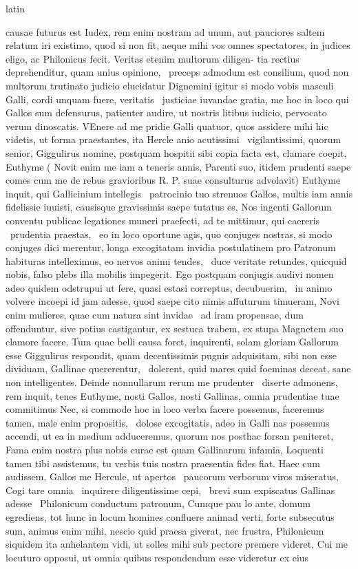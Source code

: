 \documentclass[12pt]{book}
\renewenvironment{latin}
    	{\begin{hyphenrules}{latin}}
    	{\end{hyphenrules}}
\begin{document}
\begin{pages}
\begin{latin}
\begin{Leftside}
causae futurus est Iudex, rem enim nostram ad unum, aut pauciores saltem relatum iri existimo, quod si non fit, aeque mihi vos omnes spectatores, in judices eligo, ac Philonicus fecit. Veritas etenim multorum diligen-   tia rectius deprehenditur, quam unius opinione, ﻿\ampersand\ preceps admodum est consilium, quod non multorum trutinato judicio elucidatur Dignemini igitur si modo vobis masculi Galli, cordi unquam fuere, veritatis ﻿\ampersand\ justiciae iuvandae gratia, me hoc in loco qui Gallos sum defensurus, patienter audire, ut nostris litibus iudicio, pervocato verum dinoscatis. VEnere ad me pridie Galli quatuor, quos assidere mihi hic videtis, ut forma praestantes, ita Hercle anio acutissimi ﻿\ampersand\ vigilantissimi, quorum senior, Giggulirus nomine, postquam hospitii sibi copia facta est, clamare coepit, Euthyme ( Novit enim me iam a teneris annis, Parenti suo, itidem prudenti saepe comes cum me de rebus gravioribus R. P. suae consulturus advolavit) Euthyme inquit, qui Gallicinium intellegis ﻿\ampersand\ patrocinio tuo strenuos Gallos, multis iam annis fidelissie iuuisti, causisque gravissimis saepe tutatus es, Nos ingenti Gallorum conventu publicae legationes muneri praefecti, ad te mittimur, qui caereris ﻿\ampersand\ prudentia praestas, ﻿\ampersand\ eo in loco oportune agis, quo conjuges nostras, si modo conjuges dici merentur, longa excogitatam invidia postulatinem pro Patronum habituras intelleximus, eo nervos animi tendes, ﻿\ampersand\ duce veritate retundes, quicquid nobis, falso plebs illa mobilis impegerit. Ego postquam conjugis audivi nomen adeo quidem odstrupui ut fere, quasi estasi correptus, decubuerim, ﻿\ampersand\ in animo volvere incoepi id jam adesse, quod saepe cito nimis affuturum timueram, Novi enim mulieres, quae cum natura sint invidae ﻿\ampersand\ ad iram propensae, dum offenduntur, sive potius castigantur, ex sestuca trabem, ex stupa Magnetem suo clamore facere. Tum quae belli causa foret, inquirenti, solam gloriam Gallorum esse Giggulirus respondit, quam decentissimis pugnis adquisitam, sibi non esse dividuam, Gallinae quererentur, ﻿\ampersand\ dolerent, quid mares quid foeminas deceat, sane non intelligentes. Deinde nonnullarum rerum me prudenter ﻿\ampersand\ diserte admonens, rem inquit, tenes Euthyme,   nosti Gallos, nosti Gallinas, omnia prudentiae tuae commitimus Nec, si commode hoc in loco verba facere possemus, faceremus tamen, male enim propositis, ﻿\ampersand\ dolose excogitatis, adeo in Galli nas possemus accendi, ut ea in medium adduceremus, quorum nos posthac forsan peniteret, Fama enim nostra plus nobis curae est quam Gallinarum infamia, Loquenti tamen tibi assistemus, tu verbis tuis nostra praesentia fides fiat. Haec cum audissem, Gallos me Hercule, ut apertos ﻿\ampersand\ paucorum verborum viros miseratus, Cogi tare omnia ﻿\ampersand\ inquirere diligentissime cepi, ﻿\ampersand\ brevi sum expiscatus Gallinas adesse ﻿\ampersand\ Philonicum conductum patronum, Cumque pau lo ante, domum egrediens, tot hunc in locum homines confluere animad verti, forte subsecutus sum, animus enim mihi, nescio quid praesa giverat, nec frustra, Philonicum siquidem ita anhelantem vidi, ut solles mihi sub pectore premere videret, Cui me locuturo opposui, ut omnia quibus respondendum esse videretur ex eius 
\end{Leftside}
\end{latin}
\end{pages}
\end{document}
